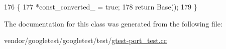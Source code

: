 \begin{DoxyCode}
176                         \{
177     *const\_converted\_ = \textcolor{keyword}{true};
178     \textcolor{keywordflow}{return} Base();
179   \}
\end{DoxyCode}


The documentation for this class was generated from the following file\+:\begin{DoxyCompactItemize}
\item 
vendor/googletest/googletest/test/\hyperlink{gtest-port__test_8cc}{gtest-\/port\+\_\+test.\+cc}\end{DoxyCompactItemize}
